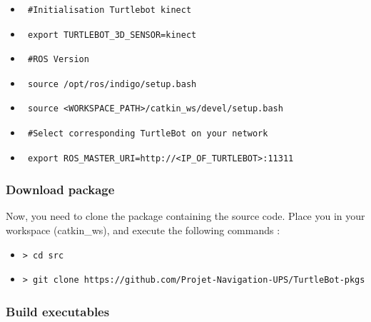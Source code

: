 \documentclass[10pt,a4paper]{article}
\begin{document}
\begin{itemize}
\item[]  \begin{verbatim} #Initialisation Turtlebot kinect \end{verbatim}
\item[]  \begin{verbatim} export TURTLEBOT_3D_SENSOR=kinect \end{verbatim}
\item[]  \begin{verbatim} #ROS Version \end{verbatim}
\item[]  \begin{verbatim} source /opt/ros/indigo/setup.bash \end{verbatim}
\item[]  \begin{verbatim} source <WORKSPACE_PATH>/catkin_ws/devel/setup.bash \end{verbatim}
\item[]  \begin{verbatim} #Select corresponding TurtleBot on your network \end{verbatim}
\item[]  \begin{verbatim} export ROS_MASTER_URI=http://<IP_OF_TURTLEBOT>:11311  \end{verbatim}
\end{itemize}

\subsubsection{Download package}

Now, you need to clone the package containing the source code. Place you in your workspace (catkin\_ws), and execute the following commands :

\begin{itemize}
\item[]  \begin{verbatim}> cd src \end{verbatim}
\item[]  \begin{verbatim}> git clone https://github.com/Projet-Navigation-UPS/TurtleBot-pkgs \end{verbatim}
\end{itemize}

\subsubsection{Build executables}
\end{document}
